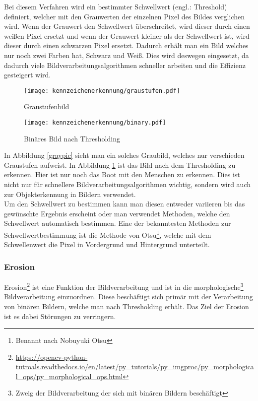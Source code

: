 Bei diesem Verfahren wird ein bestimmter Schwellwert (engl.: Threshold) definiert, welcher mit den Grauwerten der einzelnen 
Pixel des Bildes verglichen wird. Wenn der Grauwert den Schwellwert überschreitet, wird dieser durch einen weißen Pixel 
ersetzt und wenn der Grauwert kleiner als der Schwellwert ist, wird dieser durch einen schwarzen Pixel ersetzt. 
Dadurch erhält man ein Bild welches nur noch zwei Farben hat, Schwarz und Weiß. Dies wird deswegen eingesetzt, 
da dadurch viele Bildverarbeitungsalgorithmen schneller arbeiten und die Effizienz gesteigert wird.\\

\begin{figure}[htbp]
    \centering
    \begin{minipage}[t]{0.45\linewidth}
        \centering
        \texttt{[image: kennzeichenerkennung/graustufen.pdf]}
        \caption{Graustufenbild}
        \label{graypic}
    \end{minipage}
    \hfill
    \begin{minipage}[t]{0.45\linewidth}
        \centering
        \texttt{[image: kennzeichenerkennung/binary.pdf]}
        \caption{Binäres Bild nach Thresholding}
        \label{binarypic}
    \end{minipage}
\end{figure}

In Abbildung \ref{graypic} sieht man ein solches Graubild, welches nur verschieden Graustufen aufweist. In Abbildung \ref{binarypic} ist das 
Bild nach dem Thresholding zu erkennen. Hier ist nur noch das Boot mit den Menschen zu erkennen. Dies ist nicht nur für schnellere 
Bildverarbeitungsalgorithmen wichtig, sondern wird auch zur Objekterkennung in Bildern verwendet.\\

Um den Schwellwert zu bestimmen kann man diesen entweder variieren bis das gewünschte Ergebnis erscheint oder man 
verwendet Methoden, welche den Schwellwert automatisch bestimmen. Eine der bekanntesten Methoden zur Schwellwertbestimmung 
ist die Methode von Otsu\footnote{Benannt nach Nobuyuki Otsu}, welche mit dem Schwellenwert die Pixel in Vordergrund und Hintergrund unterteilt.

\subsubsection{Erosion}
Erosion\footnote{\url{https://opencv-python-tutroals.readthedocs.io/en/latest/py_tutorials/py_imgproc/py_morphological_ops/py_morphological_ops.html}} ist eine Funktion der Bildverarbeitung und ist in die morphologische\footnote{Zweig der Bildverarbeitung der sich mit binären Bildern beschäftigt} Bildverarbeitung einzuordnen. Diese beschäftigt 
sich primär mit der Verarbeitung von binären Bildern, welche man nach Thresholding erhält. Das Ziel der Erosion ist es dabei Störungen zu verringern.\\

